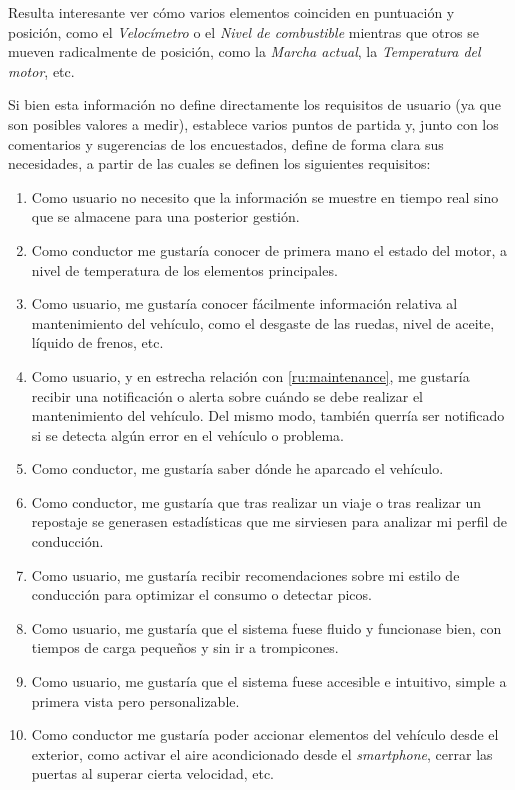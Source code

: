 Resulta interesante ver cómo varios elementos coinciden en puntuación y posición, como
el \textit{Velocímetro} o el \textit{Nivel de combustible} mientras que otros se
mueven radicalmente de posición, como la \textit{Marcha actual}, la \textit{Temperatura 
del motor}, etc.

Si bien esta información no define directamente los requisitos de usuario (ya que son
posibles valores a medir), establece varios puntos de partida y, junto con los comentarios
y sugerencias de los encuestados, define de forma clara sus necesidades,
a partir de las cuales se definen los siguientes requisitos:

\begin{enumerate}[label=\textbf{\texttt{RU-\arabic*}}]
  \item\label{ru:rt} Como usuario no necesito que la información se muestre en tiempo
        real sino que se almacene para una posterior gestión.
  \item\label{ru:status} Como conductor me gustaría conocer de primera mano el estado
        del motor, a nivel de temperatura de los elementos principales.
  \item\label{ru:maintenance} Como usuario, me gustaría conocer fácilmente
        información relativa al mantenimiento del vehículo, como el desgaste de
        las ruedas, nivel de aceite, líquido de frenos, etc.
  \item\label{ru:notifications} Como usuario, y en estrecha relación con
        \ref{ru:maintenance}, me gustaría recibir una notificación o alerta sobre
        cuándo se debe realizar el mantenimiento del vehículo. Del mismo modo,
        también querría ser notificado si se detecta algún error en el vehículo o
        problema.
  \item\label{ru:parking} Como conductor, me gustaría saber dónde he aparcado el
        vehículo.
  \item\label{ru:stats} Como conductor, me gustaría que tras realizar un viaje
        o tras realizar un repostaje se generasen estadísticas que me sirviesen para
        analizar mi perfil de conducción.
  \item\label{ru:recommendations} Como usuario, me gustaría recibir recomendaciones
        sobre mi estilo de conducción para optimizar el consumo o detectar picos.
  \item\label{ru:speed} Como usuario, me gustaría que el sistema fuese fluido y
        funcionase bien, con tiempos de carga pequeños y sin ir a trompicones.
  \item\label{ru:intuitive} Como usuario, me gustaría que el sistema fuese accesible
        e intuitivo, simple a primera vista pero personalizable.
  \item\label{ru:interactions} Como conductor me gustaría poder accionar elementos
        del vehículo desde el exterior, como activar el aire acondicionado desde
        el \textit{smartphone}, cerrar las puertas al superar cierta
        velocidad, etc.
\end{enumerate}